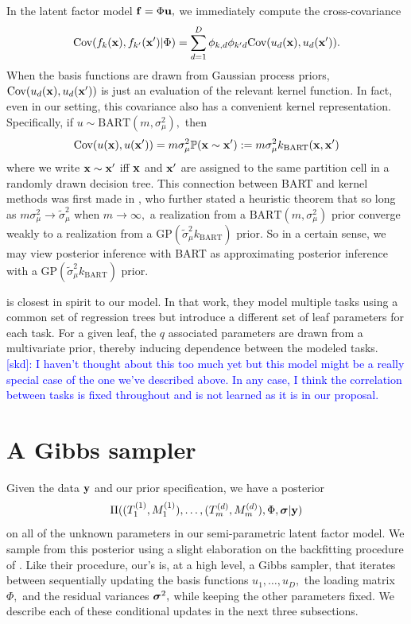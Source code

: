 \documentclass[12pt]{article}
\begin{document}
In the latent factor model $\mathbf{f} = \Phi \mathbf{u},$ we immediately compute the cross-covariance
$$
\text{Cov}(f_{k}(\mathbf{x}), f_{k'}(\mathbf{x}') | \Phi) = \sum_{d = 1}^{D}{\phi_{k,d}\phi_{k'd}\text{Cov}(u_{d}(\mathbf{x}), u_{d}(\mathbf{x}'))}.
$$
When the basis functions are drawn from Gaussian process priors, $\text{Cov}(u_{d}(\mathbf{x}), u_{d}(\mathbf{x}'))$ is just an evaluation of the relevant kernel function.
In fact, even in our setting, this covariance also has a convenient kernel representation.
Specifically, if $u \sim \text{BART}(m, \sigma^{2}_{\mu}),$ then 
$$
\text{Cov}(u(\mathbf{x}), u(\mathbf{x}')) = m\sigma^{2}_{\mu}\mathbb{P}(\mathbf{x} \sim \mathbf{x}') := m\sigma^{2}_{\mu}k_{\text{BART}}(\mathbf{x}, \mathbf{x}')
$$
where we write $\mathbf{x} \sim \mathbf{x}'$ iff $\mathbf{x}$ and $\mathbf{x}'$ are assigned to the same partition cell in a randomly drawn decision tree. 
This connection between BART and kernel methods was first made in \citet{Linero2017}, who further stated a heuristic theorem that so long as $m\sigma^{2}_{\mu} \rightarrow \tilde{\sigma}^{2}_{\mu}$ when $m \rightarrow \infty,$ a realization from a $\text{BART}(m,\sigma^{2}_{\mu})$ prior converge weakly to a realization from a $\text{GP}(\tilde{\sigma}^{2}_{\mu}k_{\text{BART}})$ prior.
So in a certain sense, we may view posterior inference with BART as approximating posterior inference with a $\text{GP}(\tilde{\sigma}^{2}_{\mu}k_{\text{BART}})$ prior.



\citet{Linero2018} is closest in spirit to our model.
In that work, they model multiple tasks using a common set of regression trees but introduce a different set of leaf parameters for each task.
For a given leaf, the $q$ associated parameters are drawn from a multivariate prior, thereby inducing dependence between the modeled tasks.
\textcolor{blue}{[skd]: I haven't thought about this too much yet but this model might be a really special case of the one we've described above. In any case, I think the correlation between tasks is fixed throughout and is not learned as it is in our proposal.}

\section{A Gibbs sampler}

Given the data $\mathbf{y}$ and our prior specification, we have a posterior 
$$
\Pi( (T_{1}^{(1)}, M_{1}^{(1)}), \ldots, (T^{(d)}_{m}, M^{(d)}_{m}), \Phi, \boldsymbol{\sigma} | \mathbf{y})
$$
on all of the unknown parameters in our semi-parametric latent factor model. 
We sample from this posterior using a slight elaboration on the backfitting procedure of \citet{Chipman2010}.
Like their procedure, our's is, at a high level, a Gibbs sampler, that iterates between sequentially updating the basis functions $u_{1}, \ldots, u_{D},$ the loading matrix $\Phi,$ and the residual variances $\boldsymbol{\sigma}^{2},$ while keeping the other parameters fixed.
We describe each of these conditional updates in the next three subsections.
\end{document}
